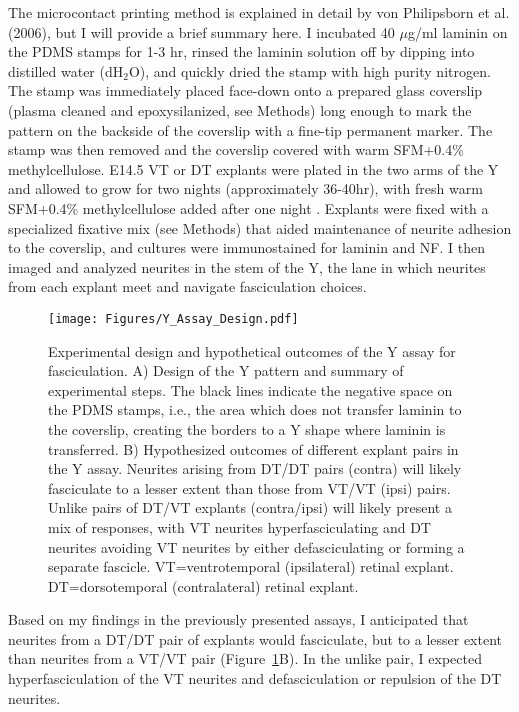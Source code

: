 The microcontact printing method is explained in detail by von Philipsborn et al. (2006), but I will provide a brief summary here.
I incubated 40 $\mu$g/ml laminin on the PDMS stamps for 1-3 hr, rinsed the laminin solution off by dipping into distilled water (dH$_2$O), and quickly dried the stamp with high purity nitrogen.
The stamp was immediately placed face-down onto a prepared glass coverslip (plasma cleaned and epoxysilanized, see Methods) long enough to mark the pattern on the backside of the coverslip with a fine-tip permanent marker.
The stamp was then removed and the coverslip covered with warm SFM+0.4\% methylcellulose.
E14.5 VT or DT explants were plated in the two arms of the Y and allowed to grow for two nights (approximately 36-40hr), with fresh warm SFM+0.4\% methylcellulose added after one night \invitro{}.
Explants were fixed with a specialized fixative mix (see Methods) that aided maintenance of neurite adhesion to the coverslip, and cultures were immunostained for laminin and NF.
I then imaged and analyzed neurites in the stem of the Y, the lane in which neurites from each explant meet and navigate fasciculation choices.
\begin{figure}[hbtp]
    \begin{center}
        \texttt{[image: Figures/Y\_Assay\_Design.pdf]}
        \caption[Experimental design and hypothetical outcomes of the Y assay for fasciculation.]
        {Experimental design and hypothetical outcomes of the Y assay for fasciculation.
        A) Design of the Y pattern and summary of experimental steps.
        The black lines indicate the negative space on the PDMS stamps, i.e., the area which does not transfer laminin to the coverslip, creating the borders to a Y shape where laminin is transferred.
        B) Hypothesized outcomes of different explant pairs in the Y assay.
        Neurites arising from DT/DT pairs (contra) will likely fasciculate to a lesser extent than those from VT/VT (ipsi) pairs.
        Unlike pairs of DT/VT explants (contra/ipsi) will likely present a mix of responses, with VT neurites hyperfasciculating and DT neurites avoiding VT neurites by either defasciculating or forming a separate fascicle.
        VT=ventrotemporal (ipsilateral) retinal explant.
        DT=dorsotemporal (contralateral) retinal explant.
        }
        \label{Figures/YAssayDesign}
    \end{center}
\end{figure}
Based on my findings in the previously presented assays, I anticipated that neurites from a DT/DT pair of explants would fasciculate, but to a lesser extent than neurites from a VT/VT pair (Figure~\ref{Figures/YAssayDesign}B).
In the unlike pair, I expected hyperfasciculation of the VT neurites and defasciculation or repulsion of the DT neurites.

